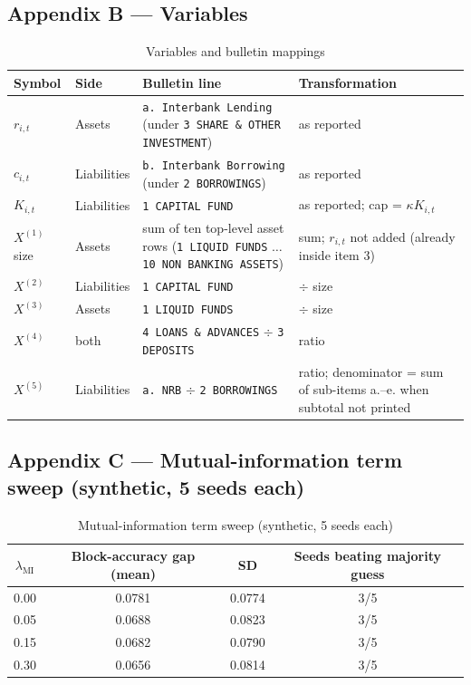 \documentclass[
  a4paper,
]{article}
\begin{document}
\pagebreak

\subsection*{Appendix B --- Variables}\label{appendix-b-variables}

\begin{table}[htbp]
  \centering
  \caption{Variables and bulletin mappings}
  \label{tab:variables}
  \begin{tabular}{ll p{4.5cm} p{4.5cm}}
    \toprule
    Symbol & Side & Bulletin line & Transformation \\
    \midrule
    $r_{i,t}$ & Assets & \texttt{a. Interbank Lending} (under \texttt{3 SHARE \& OTHER INVESTMENT}) & as reported \\
    $c_{i,t}$ & Liabilities & \texttt{b. Interbank Borrowing} (under \texttt{2 BORROWINGS}) & as reported \\
    $K_{i,t}$ & Liabilities & \texttt{1 CAPITAL FUND} & as reported; cap = $\kappa K_{i,t}$ \\
    $X^{(1)}$ size & Assets & sum of ten top-level asset rows (\texttt{1 LIQUID FUNDS} $\dots$ \texttt{10 NON BANKING ASSETS}) & sum; $r_{i,t}$ not added (already inside item 3) \\
    $X^{(2)}$ & Liabilities & \texttt{1 CAPITAL FUND} & $\div$ size \\
    $X^{(3)}$ & Assets & \texttt{1 LIQUID FUNDS} & $\div$ size \\
    $X^{(4)}$ & both & \texttt{4 LOANS \& ADVANCES} $\div$ \texttt{3 DEPOSITS} & ratio \\
    $X^{(5)}$ & Liabilities & \texttt{a. NRB} $\div$ \texttt{2 BORROWINGS} & ratio; denominator = sum of sub-items a.–e. when subtotal not printed \\
    \bottomrule
  \end{tabular}
\end{table}

\subsection*{Appendix C --- Mutual-information term sweep (synthetic, 5
seeds
each)}\label{appendix-c-mutual-information-term-sweep-synthetic-5-seeds-each}

\begin{table}[htbp]
\centering
\caption{Mutual-information term sweep (synthetic, 5 seeds each)}
\label{tab:mi_sweep}
\begin{tabular}{cccc}
\toprule
$\lambda_{\text{MI}}$ & Block-accuracy gap (mean) & SD & Seeds beating majority guess \\
\midrule
0.00 & 0.0781 & 0.0774 & 3/5 \\
0.05 & 0.0688 & 0.0823 & 3/5 \\
0.15 & 0.0682 & 0.0790 & 3/5 \\
0.30 & 0.0656 & 0.0814 & 3/5 \\
\bottomrule
\end{tabular}
\end{table}
\end{document}
